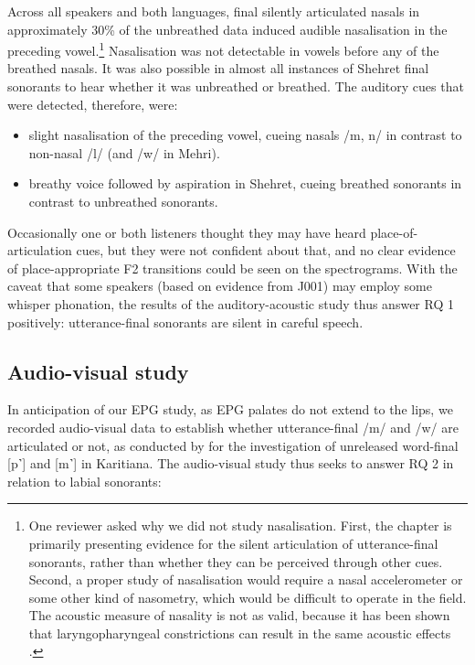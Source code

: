 \documentclass[output=paper]{langscibook}
\begin{document}
Across all speakers and both languages, final silently articulated nasals in approximately 30\% of the unbreathed data induced audible nasalisation in the preceding vowel.\footnote{One reviewer asked why we did not study nasalisation. First, the chapter is primarily presenting evidence for the silent articulation of utterance-final sonorants, rather than whether they can be perceived through other cues. Second, a proper study of nasalisation would require a nasal accelerometer or some other kind of nasometry, which would be difficult to operate in the field. The acoustic measure of nasality is not as valid, because it has been shown that laryngopharyngeal constrictions can result in the same acoustic effects \citep{Laver1980}.} Nasalisation was not detectable in vowels before any of the breathed nasals. It was also possible in almost all instances of Shehret final sonorants to hear whether it was unbreathed or breathed. The auditory cues that were detected, therefore, were:

\begin{itemize}
\item slight nasalisation of the preceding vowel, cueing nasals /m, n/ in contrast to non-nasal \mbox{/l/} (and \mbox{/w/} in Mehri).
\item breathy voice followed by aspiration in Shehret, cueing breathed sonorants in contrast to unbreathed sonorants.
\end{itemize}

Occasionally one or both listeners thought they may have heard place-of-artic\-u\-lation cues, but they were not confident about that, and no clear evidence of place-appropriate F2 transitions could be seen on the spectrograms. With the caveat that some speakers (based on evidence from J001) may employ some whisper phonation, the results of the auditory-acoustic study thus answer RQ 1 positively: utterance-final sonorants are silent in careful speech.

\subsection{Audio-visual study}
\label{sec:watson:4.2}
In anticipation of our EPG study, as EPG palates do not extend to the lips, we recorded audio-visual data to establish whether utterance-final \mbox{/m/} and \mbox{/w/} are articulated or not, as conducted by \citet[492-493]{StortoDemolin2002} for the investigation of unreleased word-final [p˺] and [m˺] in Karitiana. The audio-visual study thus seeks to answer RQ 2 in relation to labial sonorants:
\end{document}
